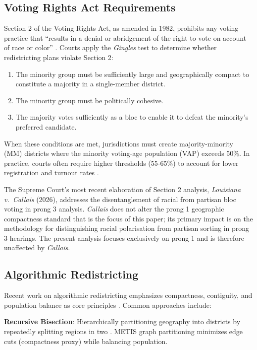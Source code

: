 \subsection{Voting Rights Act Requirements}

Section 2 of the Voting Rights Act, as amended in 1982, prohibits any voting practice that ``results in a denial or abridgement of the right to vote on account of race or color'' \citep{vra1982}. Courts apply the \emph{Gingles} test \citep{thornburg1986} to determine whether redistricting plans violate Section 2:

\begin{enumerate}
\item The minority group must be sufficiently large and geographically compact to constitute a majority in a single-member district.
\item The minority group must be politically cohesive.
\item The majority votes sufficiently as a bloc to enable it to defeat the minority's preferred candidate.
\end{enumerate}

When these conditions are met, jurisdictions must create majority-minority (MM) districts where the minority voting-age population (VAP) exceeds 50\%. In practice, courts often require higher thresholds (55-65\%) to account for lower registration and turnout rates \citep{katz2020}.

The Supreme Court's most recent elaboration of Section 2 analysis, \emph{Louisiana v.\ Callais} (2026), addresses the disentanglement of racial from partisan bloc voting in prong 3 analysis. \emph{Callais} does not alter the prong 1 geographic compactness standard that is the focus of this paper; its primary impact is on the methodology for distinguishing racial polarisation from partisan sorting in prong 3 hearings. The present analysis focuses exclusively on prong 1 and is therefore unaffected by \emph{Callais}.

\subsection{Algorithmic Redistricting}

Recent work on algorithmic redistricting emphasizes compactness, contiguity, and population balance as core principles \citep{duchin2018, fifield2020, deford2021}. Common approaches include:

\textbf{Recursive Bisection}: Hierarchically partitioning geography into districts by repeatedly splitting regions in two \citep{barnes1982, karypis1998}. METIS graph partitioning \citep{karypis1998metis} minimizes edge cuts (compactness proxy) while balancing population.

